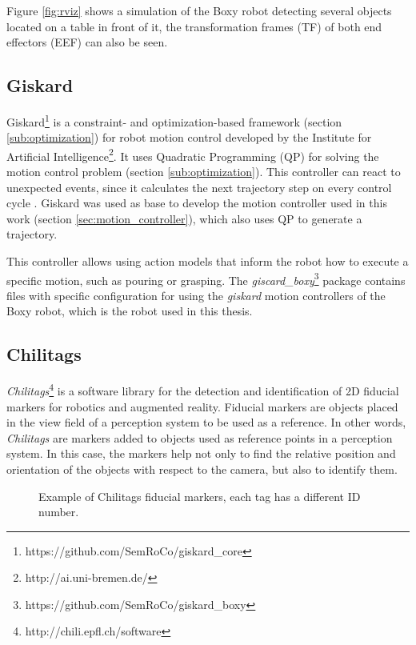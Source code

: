Figure \ref{fig:rviz} shows a simulation of the Boxy robot detecting several objects located on a table in front of it, the transformation frames (TF) of both end effectors (EEF) can also be seen.

\subsection{Giskard}
\label{subsec:giskard}
Giskard\footnote{https://github.com/SemRoCo/giskard\_core} is a constraint- and optimization-based framework (section \ref{sub:optimization}) for robot motion control developed by the Institute for Artificial Intelligence\footnote{http://ai.uni-bremen.de/}. It uses Quadratic Programming (QP)  for solving the motion control problem (section \ref{sub:optimization}). This controller can react to unexpected events, since it calculates the next trajectory step on every control cycle \citep{giskard}.  Giskard was used as base to develop the motion controller used in this work (section \ref{sec:motion_controller}), which also uses QP to generate a trajectory.

This controller allows using action models that inform the robot how to execute a specific motion, such as pouring or grasping. The \textit{giscard\_boxy}\footnote{https://github.com/SemRoCo/giskard\_boxy} package contains files with specific configuration for using the \textit{giskard} motion controllers of the Boxy robot, which is the robot used in this thesis.

\subsection{Chilitags}
\label{subsec:chili}

\textit{Chilitags}\footnote{http://chili.epfl.ch/software} is a software library for the detection and identification of 2D fiducial markers for robotics and augmented reality. Fiducial markers are objects placed in the view field of a perception system to be used as a reference. In other words, \textit{Chilitags} are markers added to objects used as reference points in a perception system. In this case, the markers help not only to find the relative position and orientation of the objects with respect to the camera, but also to identify them.
\begin{figure}[H]
	\centering \vspace{-10pt}
	\begin{subfigure}[][Tag 0]
		{\texttt{[image: 0.png]}}
	\end{subfigure}
	\begin{subfigure}[][Tag 1]
		{\texttt{[image: 1.png]}}
	\end{subfigure}
	\begin{subfigure}[][Tag 2]
		{\texttt{[image: 2.png]}}
	\end{subfigure}
	\vspace{-10pt}
	\caption[Example of Chilitags fiducial markers]{Example of Chilitags fiducial markers, each tag has a different ID number.}
	\vspace{-10pt}
	\label{fig:chilitag}
\end{figure}

